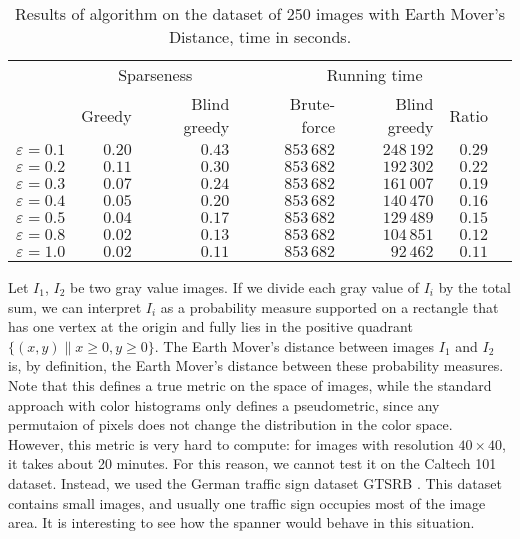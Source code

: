 \documentclass{ws-ijcga}
\renewcommand{\geq}{\geqslant}
\newcommand{\eps}{\varepsilon}
\begin{document}
\begin{table}\centering
    \begin{tabular}{@{}rrrcrrrc@{}}\toprule
        & \multicolumn{2}{c}{Sparseness} & \phantom{abc} & \multicolumn{3}{c}{Running time} \\
        \cmidrule{2-3} \cmidrule{5-7} 
                & Greedy  & Blind greedy && Brute-force & Blind greedy & Ratio \\ \midrule
$\eps = 0.1$    &   $0.20$  &  $0.43$    &&  $853\,682$   &  $248\,192$    & $0.29$   \\
$\eps = 0.2$    &   $0.11$  &  $0.30$    &&  $853\,682$   & $192\,302$    & $0.22$   \\
$\eps = 0.3$    &   $0.07$  &  $0.24$    &&  $853\,682$   & $161\,007$    & $0.19$   \\
$\eps = 0.4$    &   $0.05$  &  $0.20$    &&  $853\,682$   & $140\,470$    & $0.16$   \\
$\eps = 0.5$    &   $0.04$  &  $0.17$    &&  $853\,682$   & $129\,489$    & $0.15$   \\
$\eps = 0.8$    &   $0.02$  &  $0.13$    &&  $853\,682$   & $104\,851$    & $0.12$   \\
$\eps = 1.0$    &   $0.02$  &  $0.11$    &&  $853\,682$   & $92\,462$    & $0.11$   \\
\bottomrule
\end{tabular}
    \caption{Results of \bgrdy algorithm on the dataset of 250 images
    with Earth Mover's Distance, time in seconds.}
\label{tbl:emd_gtsrb}
\end{table}


Let $I_1$, $I_2$ be two gray value images.
If we divide each gray value of $I_{i}$
by the total sum, we can interpret $I_i$
as a probability measure supported on a rectangle
that has one vertex at the origin and
fully lies in the positive quadrant $\{ (x, y) \| x \geq 0, y \geq 0 \}$.
The Earth Mover's distance between images $I_1$ and $I_2$
is, by definition, the Earth Mover's distance between
these probability measures.
Note that this defines a true metric on the space of images,
while the standard approach with color histograms only defines
a pseudometric, since any permutaion of pixels does not
change the distribution in the color space.
However, this metric is very hard to compute:
for images with resolution $40\times 40$,
it takes about 20 minutes. For this reason,
we cannot test it on the Caltech 101 dataset.
Instead, we used the German traffic sign
dataset GTSRB \cite{gtsrb}. This
dataset contains small images, and usually
one traffic sign occupies most of the image area.
It is interesting to see how
the \bgrdy spanner would behave in this situation.
\end{document}
